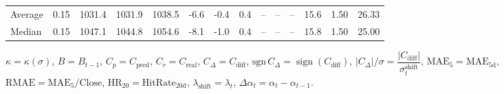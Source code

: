 \begin{threeparttable}
{\begin{tabular}{lrrrrrrrrrrrrr}
Average &     0.15 & 1031.4 & 1031.9 & 1038.5 &       -6.6 &                     -0.4 &                 0.4 &         -- &        -- &             -- &             15.6 &            1.50 &                  26.33 \\
 Median &     0.15 & 1047.1 & 1044.8 & 1054.6 &       -8.1 &                     -1.0 &                 0.4 &         -- &        -- &             -- &             15.8 &            1.50 &                  25.00 \\
\bottomrule
\end{tabular}
}
\begin{tablenotes}\footnotesize
\item $\kappa=\kappa(\sigma)$, $B=B_{t-1}$, $C_p=C_{\text{pred}}$, $C_r=C_{\text{real}}$, $C_\Delta=C_{\text{diff}}$, $\mathrm{sgn}\,C_\Delta=\operatorname{sign}(C_{\text{diff}})$, $|C_\Delta|/\sigma=\dfrac{|C_{\text{diff}}|}{\sigma_t^{\text{shift}}}$, $\mathrm{MAE}_5=\mathrm{MAE}_{5\text{d}}$, $\mathrm{RMAE}= \mathrm{MAE}_5 / \text{Close}$, $\mathrm{HR}_{20}=\mathrm{HitRate}_{20\text{d}}$, 
$\lambda_{\text{shift}}=\lambda_t$, 
$\Delta\alpha_t=\alpha_t-\alpha_{t-1}$.
\end{tablenotes}
\end{threeparttable}
\endgroup

